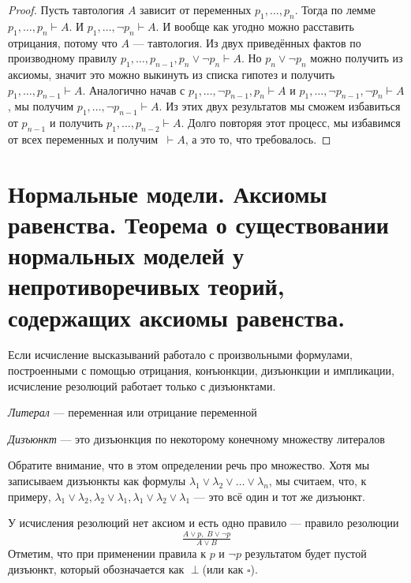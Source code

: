\documentclass{article}
\begin{document}
\begin{proof}
	Пусть тавтология $A$ зависит от переменных $p_1, \ldots, p_n$. Тогда по лемме $p_1, \ldots, p_n \vdash A$. И $p_1, \ldots, \lnot p_n \vdash A$. И вообще как угодно можно расставить отрицания, потому что $A$ --- тавтология. Из двух приведённых фактов по производному правилу $p_1, \ldots, p_{n - 1}, p_n \lor \lnot p_n \vdash A$. Но $p_n \lor \lnot p_n$ можно получить из аксиомы, значит это можно выкинуть из списка гипотез и получить $p_1, \ldots, p_{n - 1} \vdash A$. Аналогично начав с $p_1, \ldots, \lnot p_{n - 1}, p_n \vdash A$ и $p_1, \ldots, \lnot p_{n - 1}, \lnot p_n \vdash A$, мы получим $p_1, \ldots, \lnot p_{n - 1} \vdash A$. Из этих двух результатов мы сможем избавиться от $p_{n - 1}$ и получить $p_1, \ldots, p_{n - 2} \vdash A$. Долго повторяя этот процесс, мы избавимся от всех переменных и получим $\ \vdash A$, а это то, что требовалось.  
\end{proof}

\section{Нормальные модели. Аксиомы равенства. Теорема о существовании нормальных моделей у непротиворечивых теорий, содержащих аксиомы равенства.}
Если исчисление высказываний работало с произвольными формулами, построенными с помощью отрицания, конъюнкции, дизъюнкции и импликации, исчисление резолюций работает только с дизъюнктами.

\begin{definition} \textit{Литерал} --- переменная или отрицание переменной \end{definition}
\begin{definition} \textit{Дизъюнкт} --- это дизъюнкция по некоторому конечному множеству литералов \end{definition}

Обратите внимание, что в этом определении речь про множество. Хотя мы записываем дизъюнкты как формулы $\lambda_1 \lor \lambda_2 \lor \ldots \lor \lambda_n$, мы считаем, что, к примеру, $\lambda_1 \lor \lambda_2, \lambda_2 \lor \lambda_1, \lambda_1 \lor \lambda_2 \lor \lambda_1$ --- это всё один и тот же дизъюнкт.

У исчисления резолюций нет аксиом и есть одно правило --- правило резолюции
\[\tfrac{A \lor p, \; B \lor \lnot p}{A \lor B} \]
Отметим, что при применении правила к $p$ и $\lnot p$ результатом будет пустой дизъюнкт, который обозначается как $\perp$(или как $\square$). 
\end{document}
